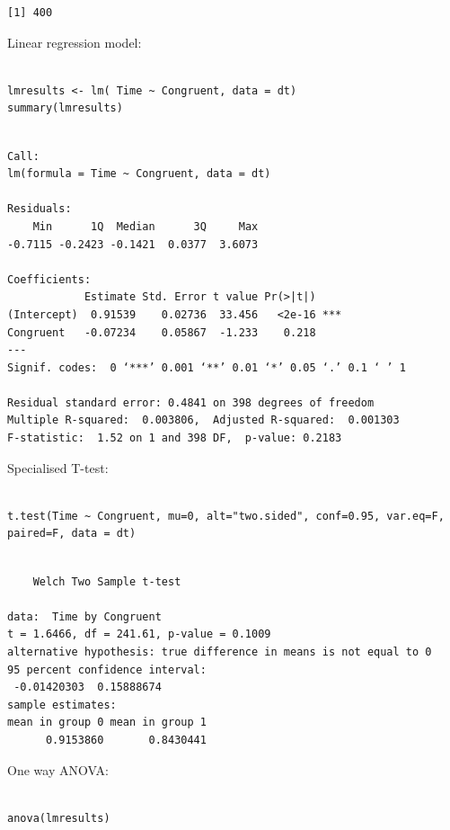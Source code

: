 \documentclass{article}
\begin{document}
\begin{verbatim}
[1] 400
\end{verbatim}


Linear regression model:

\begin{verbatim}

lmresults <- lm( Time ~ Congruent, data = dt)
summary(lmresults)

\end{verbatim}

\begin{verbatim}

Call:
lm(formula = Time ~ Congruent, data = dt)

Residuals:
    Min      1Q  Median      3Q     Max 
-0.7115 -0.2423 -0.1421  0.0377  3.6073 

Coefficients:
            Estimate Std. Error t value Pr(>|t|)    
(Intercept)  0.91539    0.02736  33.456   <2e-16 ***
Congruent   -0.07234    0.05867  -1.233    0.218    
---
Signif. codes:  0 ‘***’ 0.001 ‘**’ 0.01 ‘*’ 0.05 ‘.’ 0.1 ‘ ’ 1

Residual standard error: 0.4841 on 398 degrees of freedom
Multiple R-squared:  0.003806,	Adjusted R-squared:  0.001303 
F-statistic:  1.52 on 1 and 398 DF,  p-value: 0.2183
\end{verbatim}

Specialised T-test:

\begin{verbatim}

t.test(Time ~ Congruent, mu=0, alt="two.sided", conf=0.95, var.eq=F, paired=F, data = dt)

\end{verbatim}

\begin{verbatim}

	Welch Two Sample t-test

data:  Time by Congruent
t = 1.6466, df = 241.61, p-value = 0.1009
alternative hypothesis: true difference in means is not equal to 0
95 percent confidence interval:
 -0.01420303  0.15888674
sample estimates:
mean in group 0 mean in group 1 
      0.9153860       0.8430441
\end{verbatim}

One way ANOVA:

\begin{verbatim}

anova(lmresults)

\end{verbatim}
\end{document}
